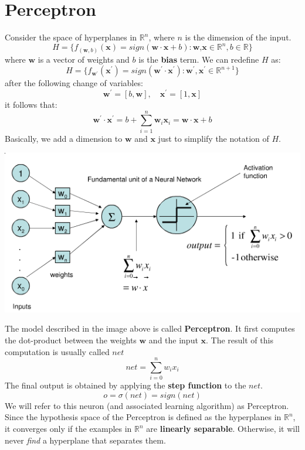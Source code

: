 \section{Perceptron}
Consider the space of hyperplanes in $\mathbb{R}^{n}$, where $n$ is the dimension of the input.
\[H = \{f_{(\textbf{w},b)}(\textbf{x}) = sign(\textbf{w} \cdot \textbf{x} + b): \textbf{w,x} \in \mathbb{R}^{n}, b \in \mathbb{R}\}\]
where $\textbf{w}$ is a vector of weights and $b$ is the \textbf{bias} term.\newline\newline
We can redefine $H$ as:
\[H = \{f_{\textbf{w}^{'}}(\textbf{x}^{'}) = sign(\textbf{w}^{'} \cdot \textbf{x}^{'}): \textbf{w}^{'}, \textbf{x}^{'} \in \mathbb{R}^{n+1}\}\]
after the following change of variables:
\[\textbf{w}^{'} = [b, \textbf{w}], \quad \textbf{x}^{'} = [1, \textbf{x}]\]
it follows that:
\[\textbf{w}^{'} \cdot \textbf{x}^{'} = b + \sum_{i = 1}^{n}\textbf{w}_{i}\textbf{x}_{i} = \textbf{w} \cdot \textbf{x} + b\]
Basically, we add a dimension to $\textbf{w}$ and $\textbf{x}$ just to simplify the notation of $H$.
\begin{center}
    \includegraphics[scale=0.5]{images/perceptron.png}
\end{center}
The model described in the image above is called \textbf{Perceptron}. It first computes the dot-product between the weights $\textbf{w}$ and the input $\textbf{x}$. The result of this computation is usually called $net$
\[net = \sum_{i=0}^{n}w_{i}x_{i}\]
The final output is obtained by applying the \textbf{step function} to the $net$.
\[o = \sigma(net) = sign(net)\]
We will refer to this neuron (and associated learning algorithm) as Perceptron.\newline\newline
Since the hypothesis space of the Perceptron is defined as the hyperplanes in $\mathbb{R}^{n}$, it converges only if the examples in $\mathbb{R}^{n}$ are \textbf{linearly separable}. Otherwise, it will never \textit{find} a hyperplane that separates them.
